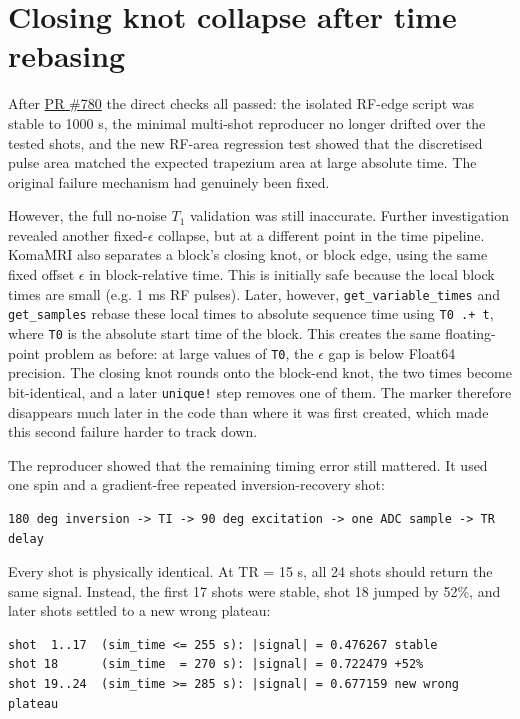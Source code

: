 \section{Closing knot collapse after time rebasing}
\label{sec:komamri-bug-2}

After \href{https://github.com/JuliaHealth/KomaMRI.jl/pull/780}{PR \#780} the
direct checks all passed: the isolated RF-edge script was stable to 1000 s, the
minimal multi-shot reproducer no longer drifted over the tested shots, and the
new RF-area regression test showed that the discretised pulse area matched the
expected trapezium area at large absolute time. The original failure mechanism
had genuinely been fixed.

However, the full no-noise $T_1$ validation was still inaccurate. Further
investigation revealed another fixed-$\epsilon$ collapse, but at a different
point in the time pipeline. KomaMRI also separates a block's closing knot, or
block edge, using the same fixed offset $\epsilon$ in block-relative time. This is
initially safe because the local block times are small (e.g. 1 ms RF pulses).
Later, however, \texttt{get\_variable\_times} and \texttt{get\_samples} rebase
these local times to absolute sequence time using \texttt{T0 .+ t}, where
\texttt{T0} is the absolute start time of the block. This creates the
same floating-point problem as before: at large values of \texttt{T0}, the
$\epsilon$ gap is below Float64 precision. The closing knot rounds onto the
block-end knot, the two times become bit-identical, and a later \texttt{unique!}
step removes one of them. The marker therefore disappears much later in the code
than where it was first created, which made this second failure harder to track
down.

The reproducer showed that the remaining timing error still mattered. It used one spin
and a gradient-free repeated inversion-recovery shot:

\begin{verbatim}
180 deg inversion -> TI -> 90 deg excitation -> one ADC sample -> TR delay
\end{verbatim}

Every shot is physically identical. At TR = 15 s, all 24 shots should return
the same signal. Instead, the first 17 shots were stable, shot 18 jumped by
52\%, and later shots settled to a new wrong plateau:

\begin{verbatim}
shot  1..17  (sim_time <= 255 s): |signal| = 0.476267 stable
shot 18      (sim_time  = 270 s): |signal| = 0.722479 +52%
shot 19..24  (sim_time >= 285 s): |signal| = 0.677159 new wrong plateau
\end{verbatim}

